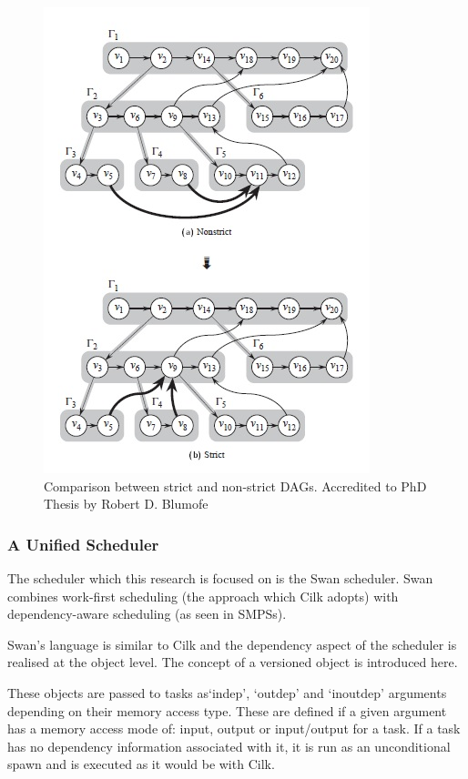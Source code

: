 \begin{figure} [tp]
	\centering
	\includegraphics {img/dagcompare.jpg}
	\caption{Comparison between strict and non-strict DAGs. Accredited to PhD Thesis by Robert D. Blumofe \citep{id13}}
	\label{strictdag}
\end{figure}

\subsubsection{A Unified Scheduler}
\label{section:swan}

The scheduler which this research is focused on is the Swan scheduler. Swan combines work-first scheduling (the approach which Cilk adopts) with dependency-aware scheduling (as seen in SMPSs).

Swan's language is similar to Cilk and the dependency aspect of the scheduler is realised at the object level. The concept of a versioned object is introduced here. 

These objects are passed to tasks as`indep', `outdep' and `inoutdep' arguments depending on their memory access type. These are defined if a given argument has a memory access mode of: input, output or input/output for a task. If a task has no dependency information associated with it, it is run as an unconditional spawn and is executed as it would be with Cilk.

